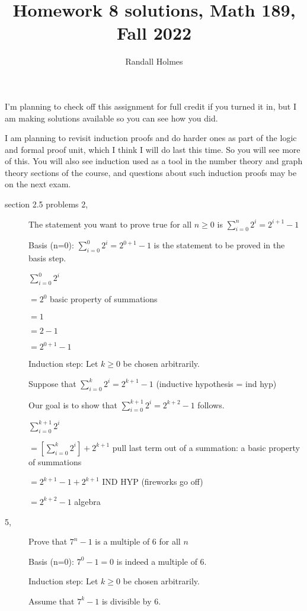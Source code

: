 \documentclass[12pt]{article}
\title{Homework 8 solutions, Math 189, Fall 2022}
\author{Randall Holmes}
\begin{document}
\maketitle

I'm planning to check off this assignment for full credit if you turned it in, but I am making solutions available
so you can see how you did.

I am planning to revisit induction proofs and do harder ones as part of the logic and formal proof unit, which I think I will do last this time.  So you will see more of this.  You will also see induction used as a tool in the number theory and graph theory sections of the course, and questions about such induction proofs may be on the next exam.


\begin{description}
\item[section 2.5 problems 2,]

The statement you want to prove true for all $n\geq 0$ is $\sum_{i=0}^n 2^i = 2^{i+1}-1$

Basis (n=0):  $\sum_{i=0}^0 2^i = 2^{0+1}-1$ is the statement to be proved in the basis step.

$\sum_{i=0}^0 2^i$

$ = 2^0$ basic property of summations

$ = 1$

$ = 2-1$

$= 2^{0+1}-1$

Induction step:  Let $k\geq 0$ be chosen arbitrarily.

Suppose that $\sum_{i=0}^k 2^i = 2^{k+1}-1$ (inductive hypothesis = ind hyp)

Our goal is to show that $\sum_{i=0}^{k+1} 2^i = 2^{k+2}-1$ follows.

$\sum_{i=0}^{k+1} 2^i$

$=[\sum_{i=0}^{k} 2^i] + 2^{k+1}$  pull last term out of a summation:  a basic property of summations

$=2^{k+1}-1 + 2^{k+1}$  IND HYP (fireworks go off)

$= 2^{k+2}-1$ algebra

\item[ 5,]  Prove that $7^{n}-1$ is a multiple of 6 for all $n$

Basis (n=0):  $7^0-1 = 0$ is indeed a multiple of 6.

Induction step:  Let $k \geq 0$ be chosen arbitrarily.

Assume that $7^k-1$ is divisible by 6.


\end{description}
\end{document}
